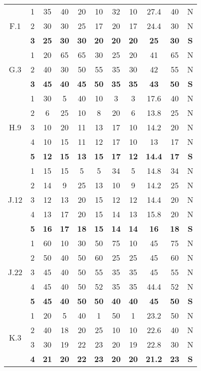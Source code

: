 \documentclass[11pt,a4paper,spanish,twoside]{report}
\begin{document}
\begin{table}[!h]
\begin{tabular}{|c|c||c|c|c|c|c||c|c|c||c|}
    \hline
    \multirow{3}{*}{F.1} & 1 & 35 & 40 & 20 & 10 & 32 & 10 & 27.4 & 40 & N \\
    & 2 & 30 & 30 & 25 & 17 & 20 & 17 & 24.4 & 30 & N \\
    & \textbf{3} & \textbf{25} & \textbf{30} & \textbf{30} & \textbf{20} &
    \textbf{20} & \textbf{20} & \textbf{25} & \textbf{30} & \textbf{S} \\ 
    \hline
    \multirow{3}{*}{G.3} & 1 & 20 & 65 & 65 & 30 & 25 & 20 & 41 & 65 & N \\
    & 2 & 40 & 30 & 50 & 55 & 35 & 30 & 42 & 55 & N \\
    & \textbf{3} & \textbf{45} & \textbf{40} & \textbf{45} & \textbf{50} &
    \textbf{35} & \textbf{35} & \textbf{43} & \textbf{50} & \textbf{S} \\ 
    \hline
    \multirow{5}{*}{H.9} & 1 & 30 & 5 & 40 & 10 & 3 & 3 & 17.6 & 40 & N \\
    & 2 & 6 & 25 & 10 & 8 & 20 & 6 & 13.8 & 25 & N \\
    & 3 & 10 & 20 & 11 & 13 & 17 & 10 & 14.2 & 20 & N \\
    & 4 & 10 & 15 & 11 & 12 & 17 & 10 & 13 & 17 & N \\
    & \textbf{5} & \textbf{12} & \textbf{15} & \textbf{13} & \textbf{15} &
    \textbf{17} & \textbf{12} & \textbf{14.4} & \textbf{17} & \textbf{S} \\ 
    \hline
    \multirow{5}{*}{J.12} & 1 & 15 & 15 & 5 & 5 & 34 & 5 & 14.8 & 34 & N \\
    & 2 & 14 & 9 & 25 & 13 & 10 & 9 & 14.2 & 25 & N \\
    & 3 & 12 & 13 & 20 & 15 & 12 & 12 & 14.4 & 20 & N \\
    & 4 & 13 & 17 & 20 & 15 & 14 & 13 & 15.8 & 20 & N \\
    & \textbf{5} & \textbf{16} & \textbf{17} & \textbf{18} & \textbf{15} &
    \textbf{14} & \textbf{14} & \textbf{16} & \textbf{18} & \textbf{S} \\ 
    \hline
    \multirow{5}{*}{J.22} & 1 & 60 & 10 & 30 & 50 & 75 & 10 & 45 & 75 & N \\
    & 2 & 50 & 40 & 50 & 60 & 25 & 25 & 45 & 60 & N \\
    & 3 & 45 & 40 & 50 & 55 & 35 & 35 & 45 & 55 & N \\
    & 4 & 45 & 40 & 50 & 52 & 35 & 35 & 44.4 & 52 & N \\
    & \textbf{5} & \textbf{45} & \textbf{40} & \textbf{50} & \textbf{50} &
    \textbf{40} & \textbf{40} & \textbf{45} & \textbf{50} & \textbf{S} \\ 
    \hline
    \multirow{4}{*}{K.3} & 1 & 20 & 5 & 40 & 1 & 50 & 1 & 23.2 & 50 & N \\
    & 2 & 40 & 18 & 20 & 25 & 10 & 10 & 22.6 & 40 & N \\
    & 3 & 30 & 19 & 22 & 23 & 20 & 19 & 22.8 & 30 & N \\
    & \textbf{4} & \textbf{21} & \textbf{20} & \textbf{22} & \textbf{23} &
    \textbf{20} & \textbf{20} & \textbf{21.2} & \textbf{23} & \textbf{S} \\ 


\end{tabular}
\end{table}
\end{document}
